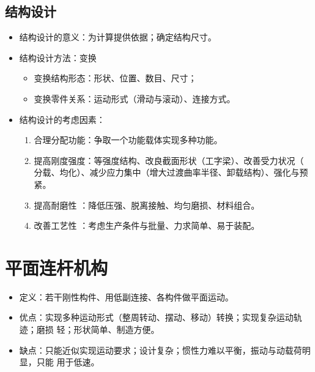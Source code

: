 \documentclass[12pt,a4paper]{article}
\newcommand{\tightlist}{\setlength{\parskip}{0pt}\setlength{\itemsep}{0pt}}
\newcommand{\hint}[1]{\textsf{（#1）}}
\newcommand{\minor}[1]{{\color{gray} #1}}
\begin{document}
\subsection{结构设计}
\begin{itemize}\tightlist
    \item 结构设计的意义：为计算提供依据；确定结构尺寸。
    \item 结构设计方法：变换
    \begin{itemize}\tightlist
        \item 变换结构形态：形状、位置、数目、尺寸；
        \item 变换零件关系：运动形式\hint{滑动与滚动}、连接方式。
    \end{itemize}
    \item 结构设计的考虑因素：
    \begin{enumerate}\tightlist
        \item \minor{合理分配功能：争取一个功能载体实现多种功能。}
        \item 提高刚度强度：等强度结构、改良截面形状\hint{工字梁}、改善受力状况\hint{
        分载、均化}、减少应力集中\hint{增大过渡曲率半径、卸载结构}、强化与预紧。
        \item 提高耐磨性\minor{：降低压强、脱离接触、均匀磨损、材料组合}。
        \item 改善工艺性\minor{：考虑生产条件与批量、力求简单、易于装配}。
    \end{enumerate}
\end{itemize}

\section{平面连杆机构}
\begin{itemize}\tightlist
    \item 定义：若干刚性构件、用低副连接、各构件做平面运动。
    \item 优点：实现多种运动形式\hint{整周转动、摆动、移动}转换；实现复杂运动轨迹；磨损
    轻；形状简单、制造方便。
    \item 缺点：只能近似实现运动要求；设计复杂；惯性力难以平衡，振动与动载荷明显，只能
    用于低速。
\end{itemize}
\end{document}
